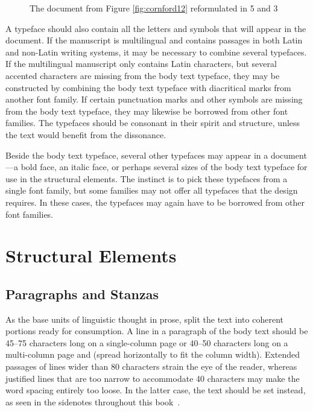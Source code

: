 \begin{figure}
  \caption{The document from Figure \ref{fig:cornford12} reformulated in
    5 and 3}
\end{figure}

A typeface should also contain all the letters and symbols that will appear in
the document. If the manuscript is multilingual and contains passages in both
Latin and non-Latin writing systems, it may be necessary to combine several
typefaces. If the multilingual manuscript only contains Latin characters, but
several accented characters are missing from the body text typeface, they may be
constructed by combining the body text typeface with diacritical marks from
another font family. If certain punctuation marks and other symbols are missing
from the body text typeface, they may likewise be borrowed from other font
families. The typefaces should be consonant in their spirit and structure,
unless the text would benefit from the
dissonance.~\cite[sec.\,5.1.2]{bringhurst92}

Beside the body text typeface, several other typefaces may appear in a
document---a bold face, an italic face, or perhaps several sizes of the body
text typeface for use in the structural elements. The instinct is to
pick these typefaces from a single font family, but some families may not offer
all typefaces that the design requires. In these cases, the typefaces may again
have to be borrowed from other font families.

\section{Structural Elements}
\subsection{Paragraphs and Stanzas}\label{sec:paragraphs}
As the base units of linguistic thought in prose,  split the
text into coherent portions ready for consumption. A line in a paragraph of the
body text should be 45--75 characters long on a single-column page or 40--50
characters long on a multi-column page and
(spread horizontally to fit the column width). Extended passages of lines wider
than 80 characters strain the eye of the reader, whereas justified lines that
are too narrow to accommodate 40 characters may make the word spacing entirely
too loose. In the latter case, the text should be set
 instead, as
seen in the sidenotes throughout this book~\cite[sec.\,2.1.2]{bringhurst92}.

